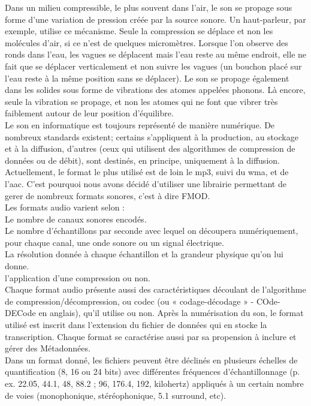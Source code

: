 \documentclass[12pt,a4paper]{report}
\begin{document}
Dans un milieu compressible, le plus souvent dans l'air, le son se propage sous forme d'une variation de pression créée par la source sonore. Un haut-parleur, par exemple, utilise ce mécanisme. Seule la compression se déplace et non les molécules d'air, si ce n'est de quelques micromètres. Lorsque l'on observe des ronds dans l'eau, les vagues se déplacent mais l'eau reste au même endroit, elle ne fait que se déplacer verticalement et non suivre les vagues (un bouchon placé sur l'eau reste à la même position sans se déplacer). Le son se propage également dans les solides sous forme de vibrations des atomes appelées phonons. Là encore, seule la vibration se propage, et non les atomes qui ne font que vibrer très faiblement autour de leur position d'équilibre.\\

Le son en informatique est toujours représenté de manière numérique. De nombreux standards existent; certains s'appliquent à la production, au stockage et à la diffusion, d'autres (ceux qui utilisent des algorithmes de compression de données ou de débit), sont destinés, en principe, uniquement à la diffusion. Actuellement, le format le plus utilisé est de loin le mp3, suivi du wma, et de l'aac. C'est pourquoi nous avons décidé d'utiliser une librairie permettant de gerer de nombreux formats sonores, c'est à dire FMOD.\\


Les formats audio varient selon :\\

    Le nombre de canaux sonores encodés.\\
  Le nombre d'échantillons par seconde avec lequel on découpera numériquement, pour chaque canal, une onde sonore ou un signal électrique.\\
   La résolution donnée à chaque échantillon et la grandeur physique qu'on lui donne.\\
    l'application d'une compression ou non.\\

Chaque format audio présente aussi des caractéristiques découlant de l'algorithme de compression/décompression, ou codec (ou « codage-décodage » - COde-DECode en anglais), qu'il utilise ou non. Après la numérisation du son, le format utilisé est inscrit dans l'extension du fichier de données qui en stocke la transcription. Chaque format se caractérise aussi par sa propension à inclure et gérer des Métadonnées.\\

Dans un format donné, les fichiers peuvent être déclinés en plusieurs échelles de quantification (8, 16 ou 24 bits) avec différentes fréquences d'échantillonnage (p. ex. 22.05, 44.1, 48, 88.2 ; 96, 176.4, 192, kilohertz) appliqués à un certain nombre de voies (monophonique, stéréophonique, 5.1 surround, etc).\\
\end{document}
